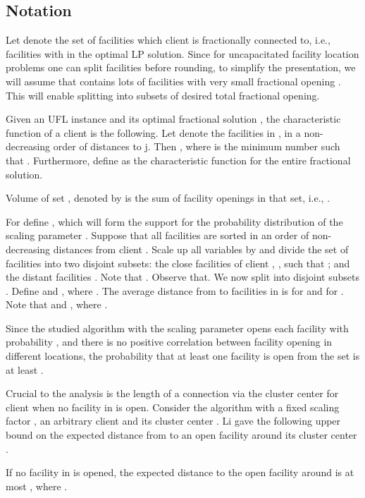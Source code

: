\documentclass{llncs}
\begin{document}
\subsection{Notation}

Let  denote the set of facilities which client  is fractionally connected to, i.e., facilities  with  in the optimal LP solution. Since for uncapacitated facility location problems one can split facilities before rounding, to simplify the presentation, we will assume that  contains lots of facilities with very small fractional opening . This will enable splitting  into subsets of desired total fractional opening.

\begin{definition}
 Given an UFL instance and its optimal fractional solution , the characteristic function  of a client  is the following. Let  denote the facilities in , in a non-decreasing order of distances to j. Then , where  is the minimum number such that . Furthermore, define  as the characteristic function for the entire fractional solution.
\end{definition}

\begin{definition}
 Volume of set , denoted by  is the sum of facility openings in that set, i.e., .
\end{definition}

 For  define , which will form the support for the probability distribution of the scaling parameter . Suppose that all facilities are sorted in an order of non-decreasing distances from client . Scale up all  variables by  and divide the set of facilities  into two disjoint subsets: the close facilities of client , , such that ; and the distant facilities . Note that .
Observe that. We now split  into disjoint subsets . Define  and , where . The average distance from  to facilities in  is  for  and  for . Note that  and , where .

Since the studied algorithm with the scaling parameter  opens each facility  with probability ,
and there is no positive correlation between facility opening in different locations,
the probability that at least one facility is open from the set  is at least .

Crucial to the analysis is the length of a connection via the cluster center  for client  when no facility in  is open.
Consider the algorithm with a fixed scaling factor , an arbitrary client  and its cluster center .
Li gave the following upper bound on the expected distance from  to an open facility around its cluster center .
 \begin{lemma} 
 \label{cluster_close_distance}
  If no facility in  is opened, the expected distance to the open facility around  is at most ,
  where .
 \end{lemma}
\end{document}
